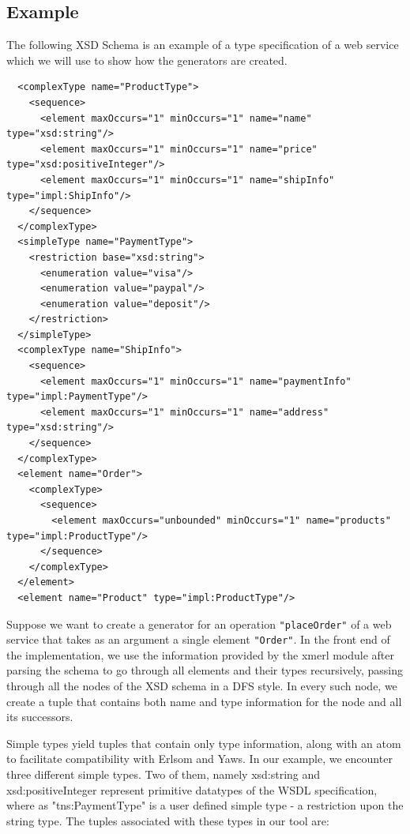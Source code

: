 \documentclass[submission,copyright,a4]{eptcs}
\begin{document}
\subsection{Example}

The following XSD Schema is an example of a type specification of a web service 
which we will use to show how the generators are created.

\begin{lstlisting}
  <complexType name="ProductType">
    <sequence>
      <element maxOccurs="1" minOccurs="1" name="name" type="xsd:string"/>
      <element maxOccurs="1" minOccurs="1" name="price" type="xsd:positiveInteger"/>
      <element maxOccurs="1" minOccurs="1" name="shipInfo" type="impl:ShipInfo"/>
    </sequence>
  </complexType>
  <simpleType name="PaymentType">
    <restriction base="xsd:string">
      <enumeration value="visa"/>
      <enumeration value="paypal"/>
      <enumeration value="deposit"/>
    </restriction>
  </simpleType>
  <complexType name="ShipInfo">
    <sequence>
      <element maxOccurs="1" minOccurs="1" name="paymentInfo" type="impl:PaymentType"/>
      <element maxOccurs="1" minOccurs="1" name="address" type="xsd:string"/>
    </sequence>
  </complexType>
  <element name="Order">
    <complexType>
      <sequence>
        <element maxOccurs="unbounded" minOccurs="1" name="products" type="impl:ProductType"/>
      </sequence>
    </complexType>
  </element>
  <element name="Product" type="impl:ProductType"/>
\end{lstlisting}


Suppose we want to create a generator for an operation \texttt{"placeOrder"} of a 
web service that takes as an argument a single element \texttt{"Order"}. In the 
front end of the implementation, we use the information provided by the xmerl 
module after parsing the schema to go through all elements and their types recursively, 
passing through all the nodes of the XSD schema in a DFS style. In every such node, 
we create a tuple that contains both name and type information for the node and 
all its successors. 

Simple types yield tuples that contain only type information, along with an atom 
to facilitate compatibility with Erlsom and Yaws. In our example, we encounter 
three different simple types. Two of them, namely xsd:string and xsd:positiveInteger 
represent primitive datatypes of the WSDL specification, where as "tns:PaymentType" 
is a user defined simple type - a restriction upon the string type. The tuples 
associated with these types in our tool are:
\end{document}
